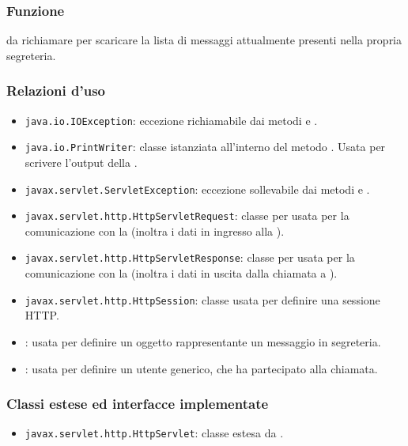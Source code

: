 
\subsubsection*{Funzione}
 da richiamare per scaricare la lista di messaggi attualmente presenti nella propria segreteria.

\subsubsection*{Relazioni d'uso}
\begin{itemize}
	\item \texttt{java.io.IOException}: eccezione richiamabile dai metodi  e .
	\item \texttt{java.io.PrintWriter}: classe istanziata all'interno del metodo . Usata per scrivere l'output della .
	\item \texttt{javax.servlet.ServletException}: eccezione sollevabile dai metodi  e .
	\item \texttt{javax.servlet.http.HttpServletRequest}:  classe per usata per la comunicazione con la  (inoltra i dati in ingresso alla ).
	\item \texttt{javax.servlet.http.HttpServletResponse}: classe per usata per la comunicazione con la  (inoltra i dati in uscita dalla chiamata a ).
	\item \texttt{javax.servlet.http.HttpSession}: classe usata per definire una sessione HTTP.
	\item {}: usata per definire un oggetto rappresentante un messaggio in segreteria.
	\item {}: usata per definire un utente generico, che ha partecipato alla chiamata.
\end{itemize}

\subsubsection*{Classi estese ed interfacce implementate}
\begin{itemize}
	\item \texttt{javax.servlet.http.HttpServlet}: classe estesa da .
\end{itemize}

